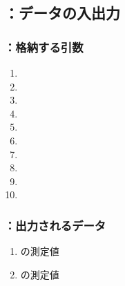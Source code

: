 \subsection{\MCenterline：データの入出力}

\subsubsection{\MCenterline：格納する引数}
\begin{enumerate}[label*=\sarrow]
\item \PMCenterlineEndFaceDifAC
\item \PMAlocationAngle
\item \PMTopOutcutACWidth
\item \PMTopOutcutBDWidth
\item \PMBottomOutcutACWidth
\item \PMBottomOutcutBDWidth
\item \PMTopReAlocationLength
\item \PMBottomReAlocationLength
\item \PMKeywayPos
\item \PMBottomOutcutLength
\end{enumerate}

\subsubsection{\MCenterline：出力されるデータ}
\begin{enumerate}[label*=\sarrow]
\item \CenterlineEndFaceDifAC の測定値
\item \CenterlineEndFaceDifBD の測定値
\end{enumerate}

\clearpage
